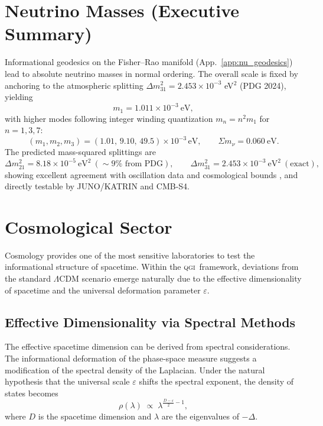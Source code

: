\documentclass{article}
\numberwithin{equation}{section}
\theoremstyle{plain}
\theoremstyle{definition}
\theoremstyle{remark}
\newcommand{\qgi}{\textsc{qgi}}
\begin{document}
\section{Neutrino Masses (Executive Summary)}
\label{sec:neutrinos}

Informational geodesics on the Fisher--Rao manifold (App.~\ref{app:nu_geodesics}) lead to absolute neutrino masses in normal ordering. The overall scale is fixed by anchoring to the atmospheric splitting $\Delta m_{31}^2 = 2.453\times 10^{-3}$ eV$^2$ (PDG 2024), yielding
\begin{equation}
m_1 = 1.011\times 10^{-3}~\text{eV},
\end{equation}
with higher modes following integer winding quantization $m_n = n^2 m_1$ for $n = 1, 3, 7$:
\begin{equation}
(m_1, m_2, m_3) = (1.01,\,9.10,\,49.5)\times 10^{-3}\,\text{eV},\qquad \Sigma m_\nu = 0.060~\text{eV}.
\end{equation}
The predicted mass-squared splittings are
\begin{equation}
\Delta m_{21}^2 = 8.18\times 10^{-5}~\text{eV}^2~(\sim 9\% \text{ from PDG}), \qquad \Delta m_{31}^2 = 2.453\times 10^{-3}~\text{eV}^2~(\text{exact}),
\end{equation}
showing excellent agreement with oscillation data and cosmological bounds \cite{PDG2024,Planck2018}, and directly testable by JUNO/KATRIN and CMB-S4.


\section{Cosmological Sector}
\label{sec:cosmo}

Cosmology provides one of the most sensitive laboratories to test the informational structure of spacetime. Within the \qgi\ framework, deviations from the standard $\Lambda$CDM scenario emerge naturally due to the effective dimensionality of spacetime and the universal deformation parameter $\varepsilon$.

\subsection{Effective Dimensionality via Spectral Methods}

The effective spacetime dimension can be derived from spectral considerations. The informational deformation of the phase-space measure suggests a modification of the spectral density of the Laplacian. Under the natural hypothesis that the universal scale $\varepsilon$ shifts the spectral exponent, the density of states becomes
\begin{equation}
\rho(\lambda) \;\propto\; \lambda^{\frac{D-\varepsilon}{2}-1},
\label{eq:spectral_density}
\end{equation}
where $D$ is the spacetime dimension and $\lambda$ are the eigenvalues of $-\Delta$.
\end{document}

